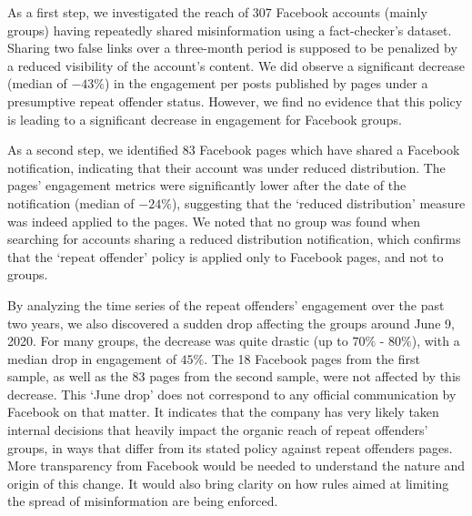 \documentclass[11pt,a4paper]{article}
\begin{document}
As a first step, we investigated the reach of 307 Facebook accounts (mainly groups) having repeatedly shared misinformation using a fact-checker's dataset. 
Sharing two false links over a three-month period is supposed to be penalized by a reduced visibility of the account's content. 
We did observe a significant decrease (median of $-43\%$) in the engagement per posts published by pages under a presumptive repeat offender status.
However, we find no evidence that this policy is leading to a significant decrease in engagement for Facebook groups.
 
As a second step, we identified 83 Facebook pages which have shared a Facebook notification, indicating that their account was under reduced distribution.
The pages' engagement metrics were significantly lower after the date of the notification (median of $-24\%$), suggesting that the `reduced distribution' measure was indeed applied to the pages.
We noted that no group was found when searching for accounts sharing a reduced distribution notification, which confirms that the `repeat offender' policy is applied only to Facebook pages, and not to groups.

By analyzing the time series of the repeat offenders’ engagement over the past two years, we also discovered a sudden drop affecting the groups around June 9, 2020.
For many groups, the decrease was quite drastic (up to $70\%$ - $80\%$), with a median drop in engagement of $45\%$.
The 18 Facebook pages from the first sample, as well as the 83 pages from the second sample, were not affected by this decrease.
This `June drop' does not correspond to any official communication by Facebook on that matter. 
It indicates that the company has very likely taken internal decisions that heavily impact the organic reach of repeat offenders' groups, in ways that differ from its stated policy against repeat offenders pages.
More transparency from Facebook would be needed to understand the nature and origin of this change. 
It would also bring clarity on how rules aimed at limiting the spread of misinformation are being enforced.
\end{document}
